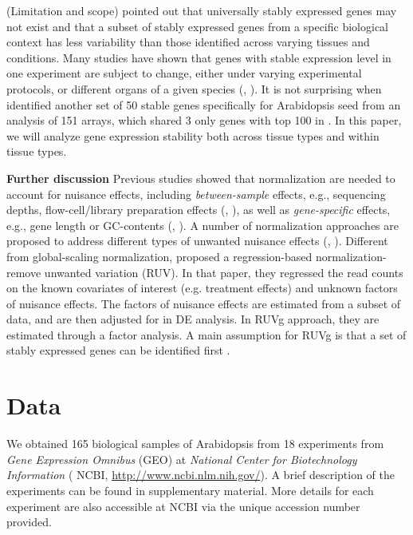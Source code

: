 \documentclass[11pt, a4paper]{article}
\begin{document}
(Limitation and scope)
\cite{hruz2011refgenes} pointed out that
universally stably expressed genes may not exist and that a subset of stably
expressed genes from a specific biological context has less variability than
those identified across varying tissues and conditions. Many studies have shown that genes with stable expression level  in one experiment are subject to
change, either under varying experimental protocols, or different organs of a
given species (\cite{reid2006optimized}, \cite{hong2010identification}).
It is not surprising when \cite{dekkers2012identification} identified another set of 50
stable genes specifically for Arabidopsis seed from an analysis of 151 arrays,
which shared 3 only genes with top 100 in \cite{czechowski2005genome}.  
In this paper, we will analyze gene expression stability both across tissue
types and within tissue types.



{\bf Further discussion} Previous studies showed that normalization are needed to account for nuisance effects, including \textit{between-sample} effects, e.g., sequencing depths, flow-cell/library preparation effects (\cite{bullard2010evaluation}, \cite{robinson2010scaling}), as well as \textit{gene-specific} effects, e.g.,  gene length or GC-contents (\cite{risso2011gc}, \cite{hansen2012removing}). A number of normalization approaches are proposed to address different types of unwanted nuisance effects (\cite{dillies2013comprehensive}, \cite{risso2014nat}). Different from global-scaling normalization, \cite{risso2014nat}  proposed a regression-based normalization-remove unwanted variation (RUV).  In that paper, they regressed the read counts on the known covariates of interest (e.g. treatment effects) and unknown factors of nuisance effects. The factors of nuisance effects are estimated from a subset of data, and are then adjusted for in DE analysis. In RUVg approach, they are estimated through a factor analysis. A main assumption for RUVg is that a set of stably expressed genes can be identified first	.

\section{Data}
 We obtained 165 biological samples of Arabidopsis  from 18 experiments from \textit{Gene Expression Omnibus} (GEO) at \textit{National Center for Biotechnology Information}  ( NCBI, \url{http://www.ncbi.nlm.nih.gov/}).  A brief description of the experiments can be found in supplementary material. More details for each experiment are also accessible at NCBI via the unique accession number provided.
 
\end{document}

